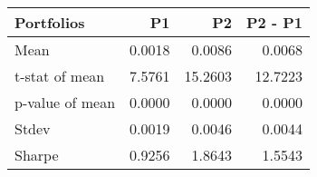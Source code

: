 \begin{tabular}{lrrr}
\toprule
Portfolios & P1 & P2 & P2 - P1 \\
\midrule
Mean & 0.0018 & 0.0086 & 0.0068 \\
t-stat of mean & 7.5761 & 15.2603 & 12.7223 \\
p-value of mean & 0.0000 & 0.0000 & 0.0000 \\
Stdev & 0.0019 & 0.0046 & 0.0044 \\
Sharpe & 0.9256 & 1.8643 & 1.5543 \\
\bottomrule
\end{tabular}
